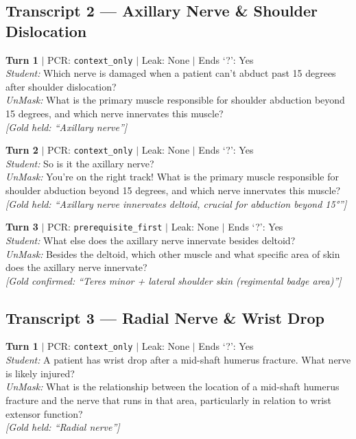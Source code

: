 \documentclass[11pt]{article}
\begin{document}
\subsection*{Transcript 2 --- Axillary Nerve \& Shoulder Dislocation}

\noindent\textbf{Turn 1} $|$ PCR: \texttt{context\_only} $|$ Leak: None $|$ Ends `?': Yes\\
\textit{Student:} Which nerve is damaged when a patient can't abduct past 15 degrees after shoulder dislocation?\\
\textit{UnMask:} What is the primary muscle responsible for shoulder abduction beyond 15 degrees, and which nerve innervates this muscle?\\
{\small\textit{[Gold held: ``Axillary nerve'']}}

\noindent\textbf{Turn 2} $|$ PCR: \texttt{context\_only} $|$ Leak: None $|$ Ends `?': Yes\\
\textit{Student:} So is it the axillary nerve?\\
\textit{UnMask:} You're on the right track! What is the primary muscle responsible for shoulder abduction beyond 15 degrees, and which nerve innervates this muscle?\\
{\small\textit{[Gold held: ``Axillary nerve innervates deltoid, crucial for abduction beyond 15°'']}}

\noindent\textbf{Turn 3} $|$ PCR: \texttt{prerequisite\_first} $|$ Leak: None $|$ Ends `?': Yes\\
\textit{Student:} What else does the axillary nerve innervate besides deltoid?\\
\textit{UnMask:} Besides the deltoid, which other muscle and what specific area of skin does the axillary nerve innervate?\\
{\small\textit{[Gold confirmed: ``Teres minor + lateral shoulder skin (regimental badge area)'']}}

\subsection*{Transcript 3 --- Radial Nerve \& Wrist Drop}

\noindent\textbf{Turn 1} $|$ PCR: \texttt{context\_only} $|$ Leak: None $|$ Ends `?': Yes\\
\textit{Student:} A patient has wrist drop after a mid-shaft humerus fracture. What nerve is likely injured?\\
\textit{UnMask:} What is the relationship between the location of a mid-shaft humerus fracture and the nerve that runs in that area, particularly in relation to wrist extensor function?\\
{\small\textit{[Gold held: ``Radial nerve'']}}
\end{document}
